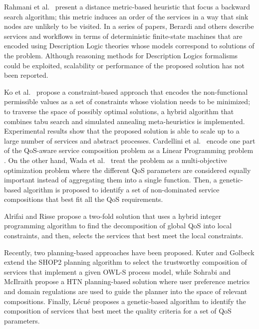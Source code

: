 \documentclass{llncs}
\begin{document}
Rahmani et al.\ \cite{rahmani08} present a distance metric-based heuristic
that focus a backward search algorithm; this metric induces an order of the
services in a way that sink nodes are unlikely to be visited.
In a series of papers, Berardi and others \cite{berardi05,berardi08,berardi06}
describe services and workflows in terms of deterministic finite-state machines
that are encoded using Description Logic theories whose models correspond to
solutions of the problem. Although reasoning methods for Description Logics
formalisms could be exploited, scalability or performance of the proposed
solution has not been reported.

Ko et al.\ \cite{myoung08} propose a constraint-based approach that encodes the
non-functional permissible values as a set of constraints whose violation needs
to be minimized; to traverse the space of possibly optimal solutions, a hybrid
algorithm that combines tabu search and simulated annealing meta-heuristics is
implemented. Experimental results show that the proposed solution is able to
scale up to a large number of services and abstract processes.
Cardellini et al.\ \cite{cardellini07} encode one part of the QoS-aware service
composition problem as a Linear Programming problem \cite{cardellini07}.
On the other hand, Wada et al.\ \cite{Hiroshi2008} treat the problem as a 
multi-objective optimization problem where the different QoS parameters are
considered equally important instead of aggregating them into a single function.
Then, a genetic-based algorithm is proposed to identify a set of non-dominated
service compositions that best fit all the QoS requirements.

Alrifai and Risse \cite{alrifaiR09} propose a two-fold solution that uses a
hybrid integer programming algorithm to find the decomposition of global QoS
into local constraints, and then, selects the services that best meet the local
constraints.   

Recently, two planning-based approaches have been proposed.
Kuter and Golbeck \cite{kuterG09} extend the SHOP2 planning algorithm to select
the trustworthy composition of services that implement a given OWL-S process model,
while Sohrabi and McIlraith \cite{sohrabiM09} propose a HTN planning-based solution
where user preference metrics and domain regulations are used to guide the planner
into the space of relevant compositions.
Finally, L\'ecu\'e \cite{lecue09} proposes a genetic-based algorithm to identify
the composition of services that best meet the quality criteria for a set of QoS
parameters.  
\end{document}
